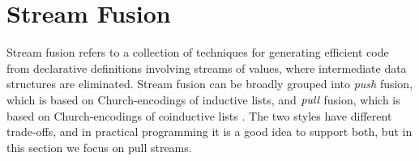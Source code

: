 \documentclass[acmsmall,screen,review,anonymous]{acmart}
\newcommand{\mit}[1]{{\mathsf{#1}}}
\theoremstyle{remark}
\newcommand{\mup}{\mit{up}}
\newcommand{\mdown}{\mit{down}}
\begin{document}

\section{Stream Fusion}

Stream fusion refers to a collection of techniques for generating efficient code
from declarative definitions involving streams of values, where intermediate
data structures are eliminated. Stream fusion can be broadly grouped into \emph{push}
fusion, which is based on Church-encodings of inductive lists, and $\emph{pull}$
fusion, which is based on Church-encodings of coinductive lists \cite{TODO}. The
two styles have different trade-offs, and in practical programming it is a good
idea to support both, but in this section we focus on pull streams.
\end{document}
